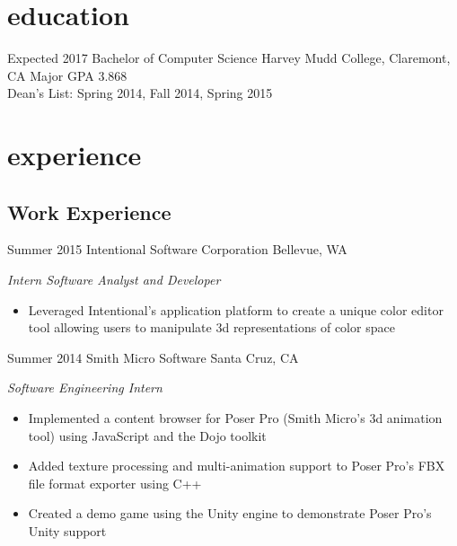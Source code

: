 \documentclass[print]{friggeri-cv} %
\begin{document}
\section{education}

\begin{entrylist}


\entry
{Expected 2017}
{Bachelor {\normalfont of Computer Science}}
{Harvey Mudd College, Claremont, CA}
{Major GPA 3.868 \\ Dean's List: Spring 2014, Fall 2014, Spring 2015}



\end{entrylist}


\section{experience}

\subsection{Work Experience}

\begin{entrylist}


\entry
{Summer 2015}
{Intentional Software Corporation}
{Bellevue, WA}
{\emph{Intern Software Analyst and Developer}
\begin{itemize}
\item Leveraged Intentional's application platform to create a unique color editor tool allowing users to manipulate 3d representations of color space
\end{itemize}}
\entry
{Summer 2014}
{Smith Micro Software}
{Santa Cruz, CA}
{\emph{Software Engineering Intern}
\begin{itemize}
\item Implemented a content browser for Poser Pro (Smith Micro's 3d animation tool) using JavaScript
and the Dojo toolkit
\item Added texture processing and multi-animation support to Poser Pro's FBX file format exporter using C++
\item Created a demo game using the Unity engine to demonstrate Poser Pro's Unity support
\end{itemize}}


\end{entrylist}
\end{document}
